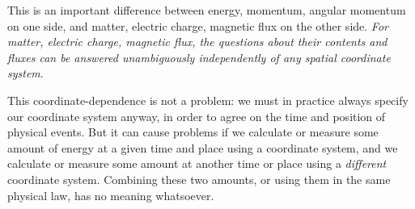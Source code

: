 \documentclass[a4paper,12pt,%
onecolumn,oneside,%
british%
]{memoir}
\renewcommand*{\|}[1][]{\nonscript\:#1\vert\nonscript\:\mathopen{}}
\begin{document}
This is an important difference between energy, momentum, angular momentum on one side, and matter, electric charge, magnetic flux on the other side. \emph{For matter, electric charge, magnetic flux, the questions about their contents and fluxes can be answered unambiguously independently of any spatial coordinate system}.
%

This coordinate-dependence is not a problem: we must in practice always specify our coordinate system anyway, in order to agree on the time and position of physical events. But it can cause problems if we calculate or measure some amount of energy at a given time and place using a coordinate system, and we calculate or measure some amount at another time or place using a \emph{different} coordinate system. Combining these two amounts, or using them in the same physical law, has no meaning whatsoever.
\end{document}
